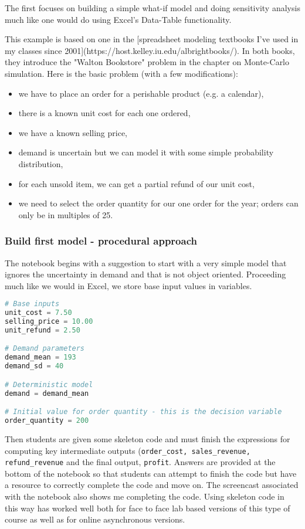 \documentclass[ited,blindrev]{informs3}              %
\newcommand{\code}[1]{\texttt{#1}}
\begin{document}
The first focuses on building a simple what-if model and doing sensitivity analysis much like one would do using Excel's Data-Table functionality.

This example is based on one in the [spreadsheet modeling textbooks I've used in my classes since 2001](https://host.kelley.iu.edu/albrightbooks/). In both books, they introduce the "Walton Bookstore" problem in the chapter on Monte-Carlo simulation. Here is the basic problem (with a few modifications):

\begin{itemize}
	\item we have to place an order for a perishable product (e.g. a calendar),
	\item there is a known unit cost for each one ordered,
	\item we have a known selling price,
	\item demand is uncertain but we can model it with some simple probability distribution,
	\item for each unsold item, we can get a partial refund of our unit cost,
	\item we need to select the order quantity for our one order for the year; orders can only be in multiples of 25.
\end{itemize}

\subsubsection{Build first model - procedural approach}
 
The notebook begins with a suggestion to start with a very simple model that ignores the uncertainty in demand and that is not object oriented. Proceeding much like we would in Excel, we store base input values in variables. 

\begin{lstlisting}[language=Python]
# Base inputs
unit_cost = 7.50
selling_price = 10.00
unit_refund = 2.50

# Demand parameters
demand_mean = 193
demand_sd = 40

# Deterministic model
demand = demand_mean

# Initial value for order quantity - this is the decision variable
order_quantity = 200
\end{lstlisting}

Then students are given some skeleton code and must finish the expressions for computing key intermediate outputs (\code{order_cost, sales_revenue, refund_revenue} and the final output, \code{profit}. Answers are provided at the bottom of the notebook so that students can attempt to finish the code but have a resource to correctly complete the code and move on. The screencast associated with the notebook also shows me completing the code. Using skeleton code in this way has worked well both for face to face lab based versions of this type of course as well as for online asynchronous versions.
\end{document}
